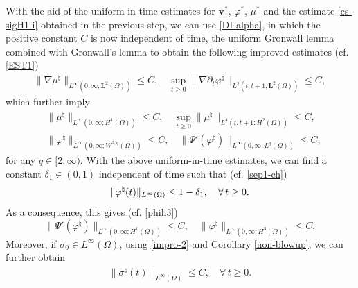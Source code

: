 \documentclass[11pt,reqno]{amsart}
\def\be{\begin{equation}}
\def\ee{\end{equation}}
\begin{document}
With the aid of the uniform in time estimates for $\bm{v}^*$, $\varphi^*$, $\mu^*$ and the estimate \eqref{es-sigH1-i} obtained in the previous step, we can use \eqref{DI-alpha}, in which the positive constant $C$ is now independent of time, the uniform Gronwall lemma combined with Gronwall's lemma to obtain the following improved estimates (cf. \eqref{EST1})
%
\begin{equation}
\label{nmu-H1-i}
\begin{split}
\|\nabla \mu^\natural\|_{L^\infty(0,\infty;\bm{L}^2(\Omega))}\leq C, \quad \sup_{t\geq 0}\|\nabla \partial_t\varphi^\natural\|_{L^2(t,t+1;\bm{L}^2(\Omega))}\leq C,
\end{split}
\end{equation}
%
which further imply
%
\begin{align}
& \| \mu^\natural\|_{L^\infty(0,\infty;H^1(\Omega))}\leq C,
\quad \sup_{t\geq 0} \|  \mu^\natural\|_{L^4(t,t+1; H^2(\Omega))} \leq C,
\label{impro-1} \\
& \| \varphi^\natural\|_{L^\infty(0,\infty; W^{2,q}(\Omega))}\leq C,
\quad \|\Psi'(\varphi^\natural)\|_{L^\infty(0,\infty;L^q(\Omega))}\leq C,
\label{impro-2}
\end{align}
%
for any $q\in [2,\infty)$. With the above uniform-in-time estimates, we can find a constant $\delta_1\in (0,1)$ independent of time such that (cf. \eqref{sep1-ch})
\be
\|\varphi^\natural(t)\|_{L^{\infty}(\Omega)} \leq 1- \delta_1,\quad \forall\, t \geq 0.
\notag
\ee
As a consequence, this gives (cf. \eqref{phih3})
%
\begin{equation}
\|\Psi' (\varphi^\natural )\|_{L^\infty (0 ,\infty ;H^1(\Omega ))}\leq C, \quad
\|\varphi^\natural\|_{L^\infty (0,\infty ;H^3(\Omega ))}\leq C.
\label{phih3-i}
\end{equation}
Moreover, if $\sigma_0\in L^\infty(\Omega)$, using \eqref{impro-2} and Corollary \ref{non-blowup}, we can further obtain
%
\begin{align}
\|\sigma^\natural(t)\|_{L^\infty(\Omega)}\leq C,\quad \forall\, t\geq 0.
\end{align}
%
\end{document}
